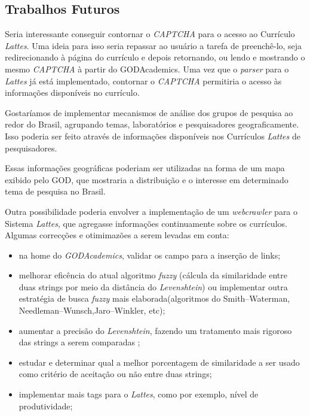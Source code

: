 \documentclass[12pt]{article}
\begin{document}
\subsection{Trabalhos Futuros}

Seria interessante conseguir contornar o \emph{CAPTCHA} para o acesso ao
Currículo \emph{Lattes}. Uma ideia para isso seria repassar ao usuário a
tarefa de preenchê-lo, seja redirecionando à página do currículo e depois
retornando, ou lendo e mostrando o mesmo \emph{CAPTCHA} à partir do
GODAcademics. Uma vez que o \emph{parser} para o \emph{Lattes} já está
implementado, contornar o \emph{CAPTCHA} permitiria o acesso às informações
disponíveis no currículo.

Gostaríamos de implementar mecanismos de análise dos grupos de pesquisa
ao redor do Brasil, agrupando temas, laboratórios e pesquisadores 
geograficamente. Isso poderia ser feito através de informações disponíveis
nos Currículos \emph{Lattes} de pesquisadores.

Essas informações geográficas poderiam ser utilizadas na forma de um mapa
exibido pelo GOD, que mostraria a distribuição e o interesse em determinado
tema de pesquisa no Brasil.

Outra possibilidade poderia envolver a implementação de um \emph{webcrawler}
para o Sistema \emph{Lattes}, que agregasse informações continuamente sobre
os currículos.\\

Algumas correcções e otimimazões a serem levadas em conta:
\begin{itemize}
	\item na home do \emph{GODAcademics}, validar os campo para a inserção de links; 
	\item melhorar eficência  do atual algoritmo \emph{fuzzy} (cálcula da similaridade entre duas strings por meio da distância do  \emph{Levenshtein}) ou implementar outra estratégia de busca \emph{fuzzy} mais elaborada(algoritmos do Smith–Waterman, Needleman–Wunsch,Jaro–Winkler, etc);
	\item aumentar a precisão do \emph{Levenshtein}, fazendo um tratamento mais rigoroso das strings a serem comparadas ;
	\item estudar e determinar qual a melhor porcentagem de similaridade a ser usado como critério de aceitação ou não entre duas strings; 
	\item implementar mais tags para o \emph{Lattes}, como por exemplo, nível de produtividade;
\end{itemize}
\end{document}

